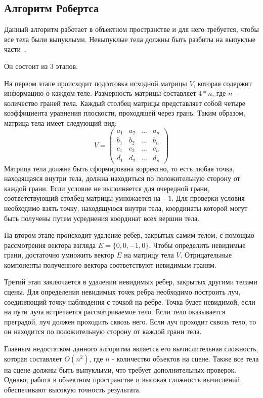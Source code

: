 \subsection{Алгоритм Робертса}


Данный алгоритм работает в объектном пространстве и для него требуется, чтобы все тела были выпуклыми. Невыпуклые тела должны быть разбиты на выпуклые части~\cite{roders}. 

Он состоит из 3 этапов.

На первом этапе происходит подготовка исходной матрицы $V$, которая содержит информацию о каждом теле. Размерность матрицы составляет $4 * n$, где $n$ - количество граней тела. Каждый столбец матрицы представляет собой четыре коэффициента уравнения плоскости, проходящей через грань. Таким образом, матрица тела имеет следующий вид:
\begin{equation}
	V = \begin{pmatrix}
		a_{1} & a_{2} & \ldots & a_{n}\\
		b_{1} & b_{2} & \ldots & b_{n}\\
		c_{1} & c_{2} & \ldots & c_{n}\\
		d_{1} & d_{2} & \ldots & d_{n}
	\end{pmatrix}
\end{equation}
Матрица тела должна быть сформирована корректно, то есть любая точка, находящаяся внутри тела, должна находиться по положительную сторону от каждой грани. Если условие не выполняется для очередной грани, соответствующий столбец матрицы умножается на $-1$. Для проверки условия необходимо взять точку, находящуюся внутри тела, координаты которой могут быть получены путем усреднения координат всех вершин тела.

На втором этапе происходит удаление ребер, закрытых самим телом, с помощью рассмотрения вектора взгляда $E = \{0, 0, -1, 0\}$. Чтобы определить невидимые грани, достаточно умножить вектор $E$ на матрицу тела $V$. Отрицательные компоненты полученного вектора соответствуют невидимым граням.

Третий этап заключается в удалении невидимых ребер, закрытых другими телами сцены. Для определения невидимых точек ребра необходимо построить луч, соединяющий точку наблюдения с точкой на ребре. Точка будет невидимой, если на пути луча встречается рассматриваемое тело. Если тело оказывается преградой, луч должен проходить сквозь него. Если луч проходит сквозь тело, то он находится по положительную сторону от каждой грани тела.

Главным недостатком данного алгоритма является его вычислительная сложность, которая составляет $O(n^2)$, где $n$ - количество объектов на сцене. Также все тела на сцене должны быть выпуклыми, что требует дополнительных проверок. Однако, работа в объектном пространстве и высокая сложность вычислений обеспечивают высокую точность результата.


